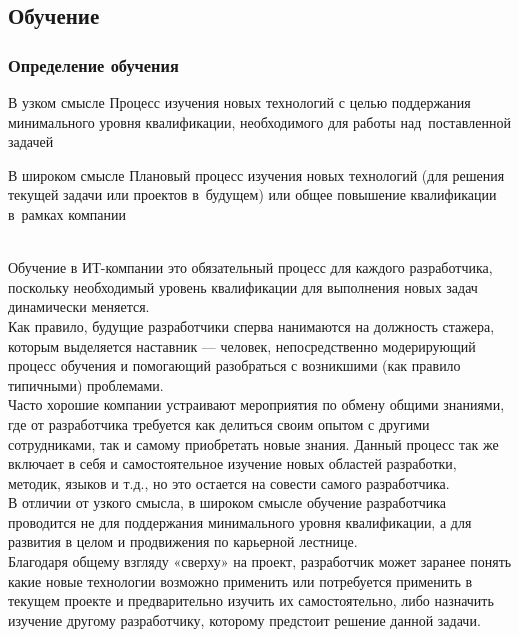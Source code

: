 \documentclass{../industrial-development}
\begin{document}
\subsection{Обучение}
\begin{frame} \frametitle{Определение обучения}
		\begin{minipage}{0.47\textwidth}
			\begin{block}{В узком смысле}
				Процесс изучения новых технологий с целью поддержания минимального уровня квалификации, необходимого для работы над~поставленной задачей
			\end{block}
		\end{minipage}
		\hfill
		\begin{minipage}{0.47\textwidth}
			\begin{block}{В широком смысле}
				Плановый процесс изучения новых технологий (для решения текущей задачи или проектов в~будущем) или общее повышение квалификации в~рамках компании
			\end{block}
		\end{minipage}
\end{frame}
\lecturenotes
\\Обучение в ИТ-компании это обязательный процесс для каждого разработчика, поскольку необходимый уровень квалификации для выполнения новых задач динамически меняется.\\
Как правило, будущие разработчики сперва нанимаются на должность стажера, которым выделяется наставник --- человек, непосредственно модерирующий процесс обучения и помогающий разобраться с возникшими (как правило типичными) проблемами.\\
Часто хорошие компании устраивают мероприятия по обмену общими знаниями, где от разработчика требуется как делиться своим опытом с другими сотрудниками, так и самому приобретать новые знания. Данный процесс так же включает в себя и самостоятельное изучение новых областей разработки, методик, языков и т.д., но это остается на совести самого разработчика.\\
В отличии от узкого смысла, в широком смысле обучение разработчика проводится не для поддержания минимального уровня квалификации, а для развития в целом и продвижения по карьерной лестнице.\\
Благодаря общему взгляду «сверху» на проект, разработчик может заранее понять какие новые технологии возможно применить или потребуется применить в текущем проекте и предварительно изучить их самостоятельно, либо назначить изучение другому разработчику, которому предстоит решение данной задачи.
\end{document}
